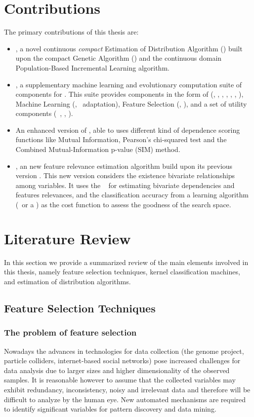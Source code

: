 \section{Contributions}
The primary contributions of this thesis are:
\begin{itemize}
\item \mbox{\TILDA\cite{Rojas2012}}, a novel continuous \emph{compact} Estimation of Distribution Algorithm (\EDA) built upon the compact Genetic Algorithm (\cGA) and the continuous domain Population-Based Incremental Learning algorithm.
\item \mbox{\GB\cite{Rojas2013}}, a supplementary machine learning and evolutionary computation suite of components for \Orange. This suite provides components in the form of \EDA (\cGA\cite{Harik99}, \UMDA\cite{Muhlenbein97}, \PBIL\cite{Baluja95}, \TILDA\cite{Rojas2012}, \PBILc\cite{Sebag98}, \UMDAc\cite{Larranaga02}, \BMDA\cite{Pelikan99}), Machine Learning (\KPerceptron, \SVM~adaptation), Feature Selection (\BFSS, \WKCostFunc), and a set of utility components (\CostFunction~, \KBuilder, \BBTester).
\item An enhanced version of \BMDA, able to uses different kind of dependence scoring functions like Mutual Information, Pearson's chi-squared test and the Combined Mutual-Information p-value (SIM\cite{?}) method.
\item \WKII, an new feature relevance estimation algorithm build upon its previous version \WK.  This new version considers the existence bivariate relationships among variables. It uses the \BMDA~ for estimating bivariate dependencies and features relevances, and the classification accuracy from a learning algorithm (\KPerceptron~or a \SVM) as the cost function to assess the goodness of the search space.
\end{itemize}
\section{Literature Review}
\label{sec:lecrev}
In this section we provide a summarized review of the main elements involved in this thesis, namely feature selection techniques, kernel classification machines, and estimation of distribution algorithms.

\subsection{Feature Selection Techniques}
\label{sec:feat1}
\subsubsection{The problem of feature selection}
\label{sec:feat11}
Nowadays the advances in technologies for data collection (the genome project, particle colliders, internet-based social networks) pose increased challenges for data analysis due to larger sizes and higher dimensionality of the observed samples.  It is reasonable however to assume that the collected variables may exhibit redundancy, inconsistency, noisy and irrelevant data and therefore will be difficult to analyze by the human eye. New automated mechanisms are required to identify significant variables for pattern discovery and data mining.

